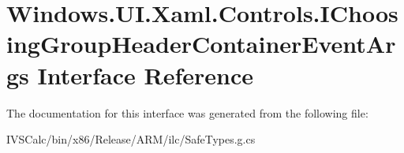 \hypertarget{interface_windows_1_1_u_i_1_1_xaml_1_1_controls_1_1_i_choosing_group_header_container_event_args}{}\section{Windows.\+U\+I.\+Xaml.\+Controls.\+I\+Choosing\+Group\+Header\+Container\+Event\+Args Interface Reference}
\label{interface_windows_1_1_u_i_1_1_xaml_1_1_controls_1_1_i_choosing_group_header_container_event_args}


The documentation for this interface was generated from the following file\+:\begin{DoxyCompactItemize}
\item 
I\+V\+S\+Calc/bin/x86/\+Release/\+A\+R\+M/ilc/Safe\+Types.\+g.\+cs\end{DoxyCompactItemize}
